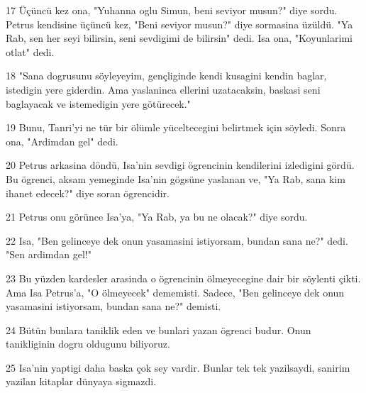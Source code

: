 \par 17 Üçüncü kez ona, "Yuhanna oglu Simun, beni seviyor musun?" diye sordu. Petrus kendisine üçüncü kez, "Beni seviyor musun?" diye sormasina üzüldü. "Ya Rab, sen her seyi bilirsin, seni sevdigimi de bilirsin" dedi. Isa ona, "Koyunlarimi otlat" dedi.
\par 18 "Sana dogrusunu söyleyeyim, gençliginde kendi kusagini kendin baglar, istedigin yere giderdin. Ama yaslaninca ellerini uzatacaksin, baskasi seni baglayacak ve istemedigin yere götürecek."
\par 19 Bunu, Tanri'yi ne tür bir ölümle yüceltecegini belirtmek için söyledi. Sonra ona, "Ardimdan gel" dedi.
\par 20 Petrus arkasina döndü, Isa'nin sevdigi ögrencinin kendilerini izledigini gördü. Bu ögrenci, aksam yemeginde Isa'nin gögsüne yaslanan ve, "Ya Rab, sana kim ihanet edecek?" diye soran ögrencidir.
\par 21 Petrus onu görünce Isa'ya, "Ya Rab, ya bu ne olacak?" diye sordu.
\par 22 Isa, "Ben gelinceye dek onun yasamasini istiyorsam, bundan sana ne?" dedi. "Sen ardimdan gel!"
\par 23 Bu yüzden kardesler arasinda o ögrencinin ölmeyecegine dair bir söylenti çikti. Ama Isa Petrus'a, "O ölmeyecek" dememisti. Sadece, "Ben gelinceye dek onun yasamasini istiyorsam, bundan sana ne?" demisti.
\par 24 Bütün bunlara taniklik eden ve bunlari yazan ögrenci budur. Onun tanikliginin dogru oldugunu biliyoruz.
\par 25 Isa'nin yaptigi daha baska çok sey vardir. Bunlar tek tek yazilsaydi, sanirim yazilan kitaplar dünyaya sigmazdi.


